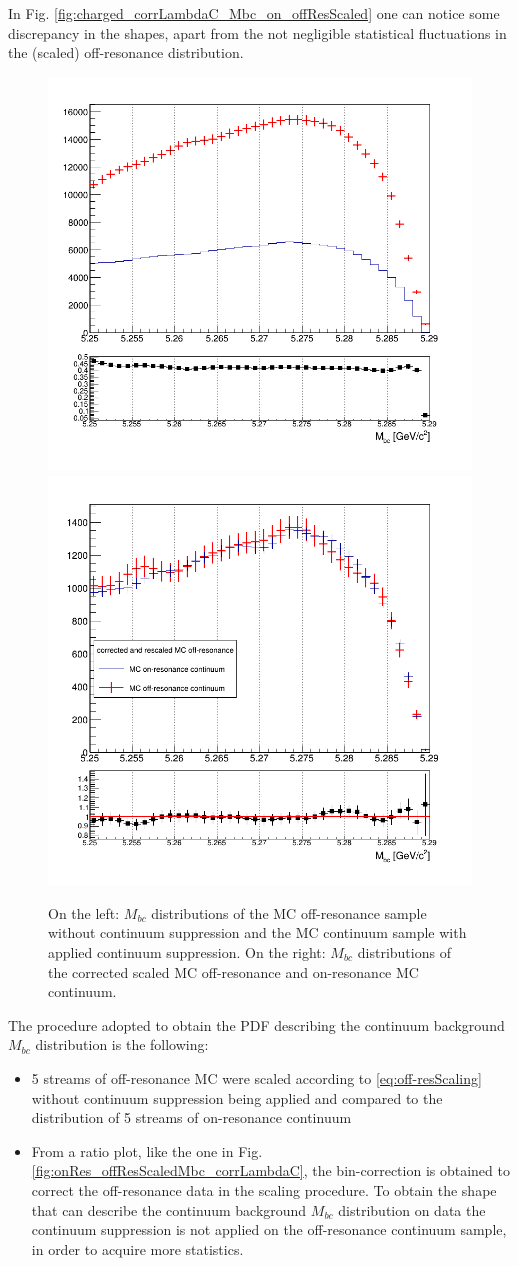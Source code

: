 In Fig. \ref{fig:charged_corrLambdaC_Mbc_on_offResScaled} one can notice some discrepancy in the shapes, apart from the not negligible statistical fluctuations in the (scaled) off-resonance distribution.  



\newpage


\begin{figure}
\centering
\subcaptionbox{\label{fig:onRes_offResScaledMbc_corrLambdaC}}
{\includegraphics[width=.46\textwidth]{04-SimultaneousFit/figs/stream01235_charged_corrLambdaC_woCScuts_Mbc_scaling.png}} \quad
\subcaptionbox{\label{fig:Mbc_scaled_bin_correctedOffResContinuum}}
{\includegraphics[width=.44\textwidth]{04-SimultaneousFit/figs/MC_on_off_resonance_stream4_continuum_2D_Mbc_corrected.png}} \quad
\caption{On the left: $M_{bc}$ distributions of the MC off-resonance sample without continuum suppression and the MC continuum sample with applied continuum suppression. On the right: $M_{bc}$ distributions of the corrected scaled MC off-resonance and on-resonance MC continuum.}
\end{figure}


The procedure adopted to obtain the PDF describing the continuum background  $M_{bc}$ distribution is the following:
\begin{itemize}

\item 5 streams of off-resonance MC were scaled according to \cref{eq:off-resScaling} without continuum suppression being applied and compared to the distribution of 5 streams of on-resonance continuum
\item From a ratio plot, like the one in Fig. \ref{fig:onRes_offResScaledMbc_corrLambdaC}, the bin-correction is obtained to correct the off-resonance data in the scaling procedure.
To obtain the shape that can describe the continuum background  $M_{bc}$ distribution on data the continuum suppression is not applied on the off-resonance continuum sample, in order to acquire more statistics. 
\end{itemize}

